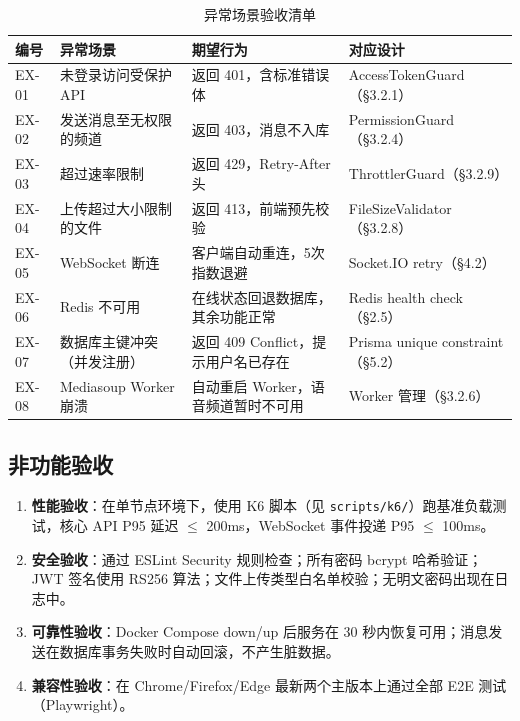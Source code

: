 \begin{table}[H]
\centering
\caption{异常场景验收清单}
\begin{tabularx}{\textwidth}{L{1.0cm}L{3.0cm}L{2.0cm}Y}
\toprule
\textbf{编号} & \textbf{异常场景} & \textbf{期望行为} & \textbf{对应设计} \\
\midrule
EX-01 & 未登录访问受保护 API & 返回 401，含标准错误体 & AccessTokenGuard（\S 3.2.1） \\
EX-02 & 发送消息至无权限的频道 & 返回 403，消息不入库 & PermissionGuard（\S 3.2.4） \\
EX-03 & 超过速率限制 & 返回 429，Retry-After 头 & ThrottlerGuard（\S 3.2.9） \\
EX-04 & 上传超过大小限制的文件 & 返回 413，前端预先校验 & FileSizeValidator（\S 3.2.8） \\
EX-05 & WebSocket 断连 & 客户端自动重连，5次指数退避 & Socket.IO retry（\S 4.2） \\
EX-06 & Redis 不可用 & 在线状态回退数据库，其余功能正常 & Redis health check（\S 2.5） \\
EX-07 & 数据库主键冲突（并发注册） & 返回 409 Conflict，提示用户名已存在 & Prisma unique constraint（\S 5.2） \\
EX-08 & Mediasoup Worker 崩溃 & 自动重启 Worker，语音频道暂时不可用 & Worker 管理（\S 3.2.6） \\
\bottomrule
\end{tabularx}
\label{tab:accept-exceptions}
\end{table}

\subsection{非功能验收}

\begin{enumerate}[itemsep=0pt]
  \item \textbf{性能验收}：在单节点环境下，使用 K6 脚本（见 \texttt{scripts/k6/}）跑基准负载测试，核心 API P95 延迟 $\le$ 200ms，WebSocket 事件投递 P95 $\le$ 100ms。
  \item \textbf{安全验收}：通过 ESLint Security 规则检查；所有密码 bcrypt 哈希验证；JWT 签名使用 RS256 算法；文件上传类型白名单校验；无明文密码出现在日志中。
  \item \textbf{可靠性验收}：Docker Compose down/up 后服务在 30 秒内恢复可用；消息发送在数据库事务失败时自动回滚，不产生脏数据。
  \item \textbf{兼容性验收}：在 Chrome/Firefox/Edge 最新两个主版本上通过全部 E2E 测试（Playwright）。
\end{enumerate}

